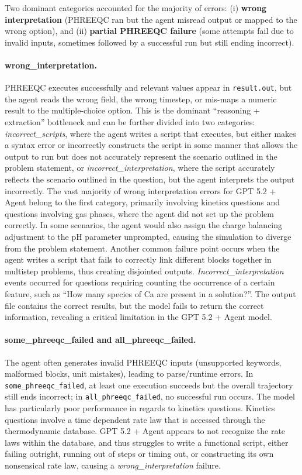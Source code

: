 \documentclass{article}
\begin{document}
Two dominant categories accounted for the majority of errors: (i) \textbf{wrong interpretation} (PHREEQC ran but the agent misread output or mapped to the wrong option), and (ii) \textbf{partial PHREEQC failure} (some attempts fail due to invalid inputs, sometimes followed by a successful run but still ending incorrect).

\paragraph{wrong\_interpretation.}
PHREEQC executes successfully and relevant values appear in \texttt{result.out}, but the agent reads the wrong field, the wrong timestep, or mis-maps a numeric result to the multiple-choice option. This is the dominant ``reasoning + extraction'' bottleneck and can be further divided into two categories: \textit{incorrect\_scripts}, where the agent writes a script that executes, but either makes a syntax error or incorrectly constructs the script in some manner that allows the output to run but does not accurately represent the scenario outlined in the problem statement, or \textit{incorrect\_interpretation}, where the script accurately reflects the scenario outlined in the question, but the agent interprets the output incorrectly. The vast majority of wrong interpretation errors for GPT 5.2 + Agent belong to the first category, primarily involving kinetics questions and questions involving gas phases, where the agent did not set up the problem correctly. In some scenarios, the agent would also assign the charge balancing adjustment to the pH parameter unprompted, causing the simulation to diverge from the problem statement. Another common failure point occurs when the agent writes a script that fails to correctly link different blocks together in multistep problems, thus creating disjointed outputs. \textit{Incorrect\_interpretation} events occurred for questions requiring counting the occurrence of a certain feature, such as ``How many species of Ca are present in a solution?''. The output file contains the correct results, but the model fails to return the correct information, revealing a critical limitation in the GPT 5.2 + Agent model.

\paragraph{some\_phreeqc\_failed and all\_phreeqc\_failed.}
The agent often generates invalid PHREEQC inputs (unsupported keywords, malformed blocks, unit mistakes), leading to parse/runtime errors. In \texttt{some\_phreeqc\_failed}, at least one execution succeeds but the overall trajectory still ends incorrect; in \texttt{all\_phreeqc\_failed}, no successful run occurs. The model has particularly poor performance in regards to kinetics questions. Kinetics questions involve a time dependent rate law that is accessed through the thermodynamic database. GPT 5.2 + Agent appears to not recognize the rate laws within the database, and thus struggles to write a functional script, either failing outright, running out of steps or timing out, or constructing its own nonsensical rate law, causing a \textit{wrong\_interpretation} failure.
\end{document}
